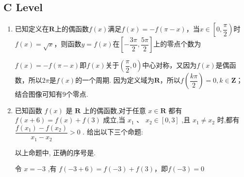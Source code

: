 \subsection*{C Level}
\begin{enumerate}
    \item 已知定义在$\mathbf{R}$上的偶函数$f(x)$满足$f(x) = -f(\pi - x)$，当$x \in \left[0, \dfrac{\pi}{2}\right)$时$f(x) = \sqrt{x}$，则函数$y = f(x)$在$\left[-\dfrac{3\pi}{2}, \dfrac{5\pi}{2}\right]$上的零点个数为
    \begin{jieda}
        $f(x) = -f(\pi - x)$即$f(x)$关于$\left(\dfrac{\pi}{2}, 0\right)$中心对称，又因为$f(x)$是偶函数，所以$2\pi$是$f(x)$的一个周期. 因为定义域为$\mathbf{R}$，所以$f\left(\dfrac{k\pi}{2}\right) = 0, k \in \mathbf{Z}$；结合图像可知有9个零点.
    \end{jieda}
    \item 已知函数 $f\left( x\right)$ 是 $\mathbf{R}$ 上的偶函数,对于任意 $x \in  \mathbf{R}$ 都有 $f\left( {x + 6}\right)  = f\left( x\right)  + f\left( 3\right)$ 成立,当 ${x}_{1}$ 、 ${x}_{2} \in  \left\lbrack  {0,3}\right\rbrack$ ,且 ${x}_{1} \neq  {x}_{2}$ 时,都有 $\dfrac{f\left( {x}_{1}\right)  - f\left( {x}_{2}\right) }{{x}_{1} - {x}_{2}} > 0$ . 给出以下三个命题:
    以上命题中, 正确的序号是.
    \begin{jieda}
        令 $x =  - 3$ ,有 $f\left( {-3 + 6}\right)  = f\left( {-3}\right)  + f\left( 3\right)$，即$f(-3) = 0$
        

\end{jieda}
\end{enumerate}
